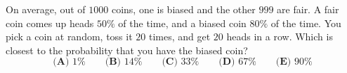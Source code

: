 On average, out of $1000$ coins, one is biased and the other $999$ are fair. A fair coin comes up heads $50\%$ of the time, and a biased coin $80\%$ of the time. You pick a coin at random, toss it $20$ times, and get $20$ heads in a row. Which is closest to the probability that you have the biased coin?
\[\textbf{(A) }1\%\qquad\textbf{(B) }14\%\qquad\textbf{(C) }33\%\qquad\textbf{(D) }67\%\qquad\textbf{(E) }90\%\]
